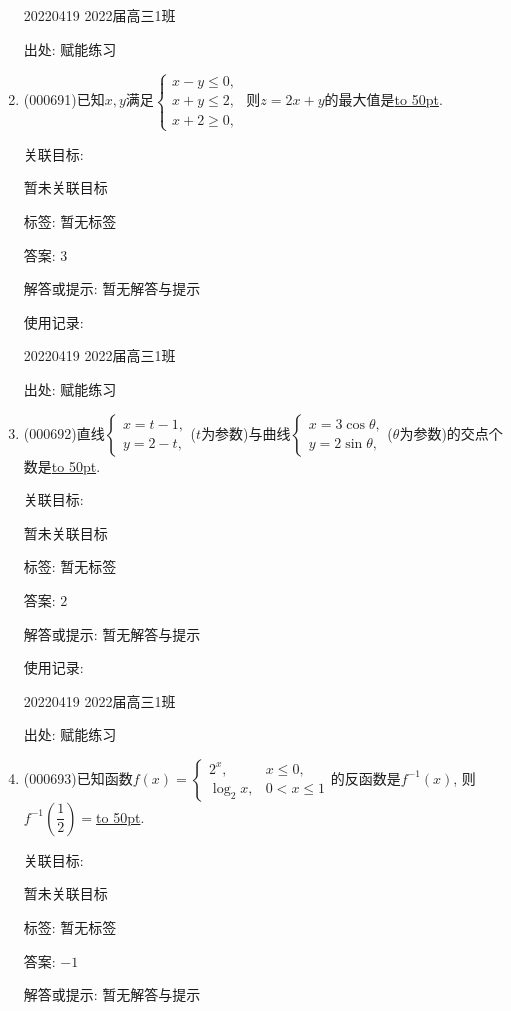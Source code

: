 \documentclass[10pt,a4paper]{article}
\newcommand{\blank}[1]{\underline{\hbox to #1pt{}}}
\begin{document}
\begin{enumerate}[1.]
20220419	2022届高三1班	


出处: 赋能练习
\item { (000691)}已知$x,y$满足$\begin{cases} x-y\le 0,\\ x+y\le 2, \\ x+2 \ge 0,\end{cases}$ 则$z=2x+y$的最大值是\blank{50}.


关联目标:

暂未关联目标



标签: 暂无标签

答案: $3$

解答或提示: 暂无解答与提示

使用记录:

20220419	2022届高三1班	


出处: 赋能练习
\item { (000692)}直线$\begin{cases} x=t-1, \\ y=2-t,\end{cases}$($t$为参数)与曲线$\begin{cases} x=3\cos\theta, \\ y=2\sin\theta,\end{cases}$($\theta$为参数)的交点个数是\blank{50}.


关联目标:

暂未关联目标



标签: 暂无标签

答案: $2$

解答或提示: 暂无解答与提示

使用记录:

20220419	2022届高三1班	


出处: 赋能练习
\item { (000693)}已知函数$f(x)=\begin{cases}2^x, & x\le 0, \\ \log_2 x, & 0<x\le 1\end{cases}$的反函数是$f^{-1}(x)$, 则$f^{-1}(\dfrac12)=$\blank{50}.


关联目标:

暂未关联目标



标签: 暂无标签

答案: $-1$

解答或提示: 暂无解答与提示


\end{enumerate}
\end{document}
